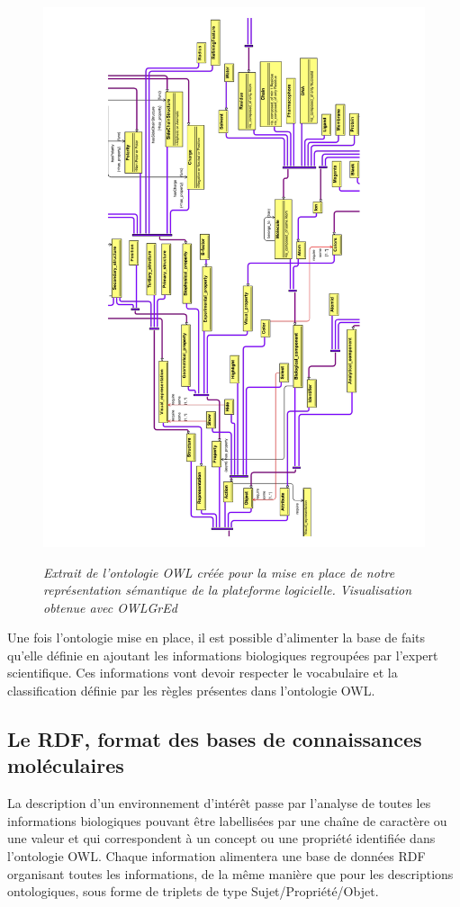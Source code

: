 \begin{figure}
  \centering
  {\includegraphics[width=0.8\linewidth]{./figures/ch5/ontology}}
    \caption{\it Extrait de l'ontologie OWL créée pour la mise en place de notre représentation sémantique de la plateforme logicielle. Visualisation obtenue avec OWLGrEd \cite{barzdins2010owlgred}}
  \label{Fig:ontology}
  \hspace{0.3cm}
\end{figure}

Une fois l'ontologie mise en place, il est possible d'alimenter la base de faits qu'elle définie en ajoutant les informations biologiques regroupées par l'expert scientifique. Ces informations vont devoir respecter le vocabulaire et la classification définie par les règles présentes dans l'ontologie OWL.

\subsection{Le RDF, format des bases de connaissances moléculaires} \label{rdf_import}

La description d'un environnement d'intérêt passe par l'analyse de toutes les informations biologiques pouvant être labellisées par une chaîne de caractère ou une valeur et qui correspondent à un concept ou une propriété identifiée dans l'ontologie OWL. Chaque information alimentera une base de données RDF organisant toutes les informations, de la même manière que pour les descriptions ontologiques, sous forme de triplets de type Sujet/Propriété/Objet.

